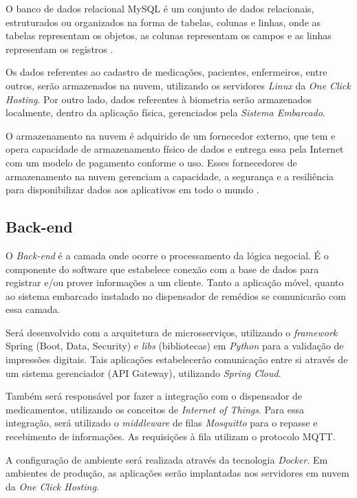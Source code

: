O banco de dados relacional MySQL é um conjunto de dados relacionais, estruturados ou organizados na forma de tabelas, colunas e linhas, onde as tabelas representam os objetos, as colunas representam os campos e as linhas representam os registros \cite{EDUCBA_2020}.

Os dados referentes ao cadastro de medicações, pacientes, enfermeiros, entre outros, serão armazenados na nuvem, utilizando os servidores \textit{Linux} da \textit{One Click Hosting}. Por outro lado, dados referentes à biometria serão armazenados localmente, dentro da aplicação física, gerenciados pela \emph{Sistema Embarcado}.

O armazenamento na nuvem é adquirido de um fornecedor externo, que tem e opera capacidade de armazenamento físico de dados e entrega essa pela Internet com um modelo de pagamento conforme o uso. Esses fornecedores de armazenamento na nuvem gerenciam a capacidade, a segurança e a resiliência para disponibilizar dados aos aplicativos em todo o mundo \cite{AMAZONWEBSERVICES_2020}.

\subsection{Back-end}\label{sec:software_backend}
O \emph{Back-end} é a camada onde ocorre o processamento da lógica negocial. É o componente do software que estabelece conexão com a base de dados para registrar e/ou prover informações a um cliente. Tanto a aplicação móvel, quanto ao sistema embarcado instalado no dispensador de remédios se comunicarão com essa camada.

Será desenvolvido com a arquitetura de microsserviços, utilizando o \emph{framework} Spring (Boot, Data, Security) e \emph{libs} (bibliotecas) em \textit{Python} para a validação de impressões digitais. 
Tais aplicações estabelecerão comunicação entre si através de um sistema gerenciador (API Gateway), utilizando \textit{Spring Cloud}.

Também será responsável por fazer a integração com o dispensador de medicamentos, utilizando os conceitos de \emph{Internet of Things}. Para essa integração, será utilizado o \emph{middleware} de filas \textit{Mosquitto} para o repasse e recebimento de informações. As requisições à fila utilizam o protocolo MQTT.

A configuração de ambiente será realizada através da tecnologia \textit{Docker}. Em ambientes de produção, as aplicações serão implantadas nos servidores em nuvem da \textit{One Click Hosting}.

